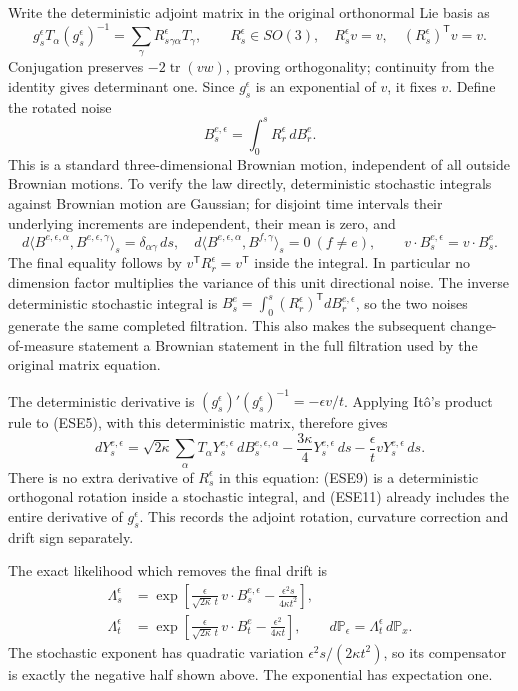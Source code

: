 \documentclass[11pt]{article}
\begin{document}
Write the deterministic adjoint matrix in the original orthonormal Lie basis as
\[
 g_s^\epsilon T_\alpha(g_s^\epsilon)^{-1}
       =\sum_\gamma R_s^\epsilon{}_{\gamma\alpha}T_\gamma,\qquad
 R_s^\epsilon\in SO(3),\quad
 R_s^\epsilon v=v,\quad (R_s^\epsilon)^{\mathsf T}v=v.
 \tag{ESE8}
\]
Conjugation preserves \(-2\operatorname{tr}(vw)\), proving orthogonality; continuity from the identity gives determinant one. Since \(g_s^\epsilon\) is an exponential of \(v\), it fixes \(v\). Define the rotated noise
\[
 B_s^{e,\epsilon}=\int_0^sR_r^\epsilon\,dB_r^e.
 \tag{ESE9}
\]
This is a standard three-dimensional Brownian motion, independent of all outside Brownian motions. To verify the law directly, deterministic stochastic integrals against Brownian motion are Gaussian; for disjoint time intervals their underlying increments are independent, their mean is zero, and
\[
 d\langle B^{e,\epsilon,\alpha},B^{e,\epsilon,\gamma}\rangle_s
       =\delta_{\alpha\gamma}\,ds,\quad
 d\langle B^{e,\epsilon,\alpha},B^{f,\gamma}\rangle_s=0\ (f\ne e),
 \qquad v\cdot B_s^{e,\epsilon}=v\cdot B_s^e .
 \tag{ESE10}
\]
The final equality follows by \(v^{\mathsf T}R_r^\epsilon=v^{\mathsf T}\) inside the integral. In particular no dimension factor multiplies the variance of this unit directional noise.
The inverse deterministic stochastic integral is \(B_s^e=\int_0^s(R_r^\epsilon)^{\mathsf T}dB_r^{e,\epsilon}\), so the two noises generate the same completed filtration. This also makes the subsequent change-of-measure statement a Brownian statement in the full filtration used by the original matrix equation.

The deterministic derivative is
\((g_s^\epsilon)'(g_s^\epsilon)^{-1}=-\epsilon v/t\).
Applying Itô's product rule to (ESE5), with this deterministic matrix, therefore gives
\[
 dY_s^{e,\epsilon}
 =\sqrt{2\kappa}\sum_\alpha T_\alpha Y_s^{e,\epsilon}
                                  \,dB_s^{e,\epsilon,\alpha}
   -\frac{3\kappa}{4}Y_s^{e,\epsilon}\,ds
   -\frac{\epsilon}{t}vY_s^{e,\epsilon}\,ds.
 \tag{ESE11}
\]
There is no extra derivative of \(R_s^\epsilon\) in this equation: (ESE9) is a deterministic orthogonal rotation inside a stochastic integral, and (ESE11) already includes the entire derivative of \(g_s^\epsilon\). This records the adjoint rotation, curvature correction and drift sign separately.

The exact likelihood which removes the final drift is
\[
 \begin{aligned}
 \Lambda_s^\epsilon
 &=\exp\left[
   \frac{\epsilon}{\sqrt{2\kappa}\,t}\,v\cdot B_s^{e,\epsilon}
                      -\frac{\epsilon^2s}{4\kappa t^2}\right],\\
 \Lambda_t^\epsilon
 &=\exp\left[
   \frac{\epsilon}{\sqrt{2\kappa}\,t}\,v\cdot B_t^e
                      -\frac{\epsilon^2}{4\kappa t}\right],\qquad
 d\mathbb P_\epsilon=\Lambda_t^\epsilon\,d\mathbb P_x .
 \end{aligned}\tag{ESE12}
\]
The stochastic exponent has quadratic variation
\(\epsilon^2s/(2\kappa t^2)\), so its compensator is exactly the negative half shown above. The exponential has expectation one.
\end{document}

